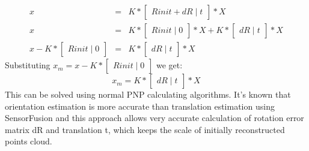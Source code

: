 \begin{equation} \label{eq:projectionRotError1}
\begin{array}{rcl}
 x & = & K * \begin{bmatrix}Rinit + dR\mid t\end{bmatrix} * X \\
 x & = & K * \begin{bmatrix}Rinit\mid 0\end{bmatrix} * X + K * \begin{bmatrix}dR\mid t\end{bmatrix} * X \\
 x - K * \begin{bmatrix}Rinit\mid 0\end{bmatrix} & = & K * \begin{bmatrix}dR\mid t\end{bmatrix} * X
\end{array}
\end{equation}
Substituting $x_{m} = x - K * \begin{bmatrix}Rinit\mid 0\end{bmatrix}$ we get: 
\begin{equation} \label{eq:projectionRotError2}
x_{m} = K * \begin{bmatrix}dR\mid t\end{bmatrix} * X
\end{equation}
This can be solved using normal PNP calculating algorithms. It's known that orientation estimation is more accurate than translation estimation using SensorFusion and this approach allows very accurate calculation of rotation error matrix dR and translation t, which keeps the scale of initially reconstructed points cloud.
